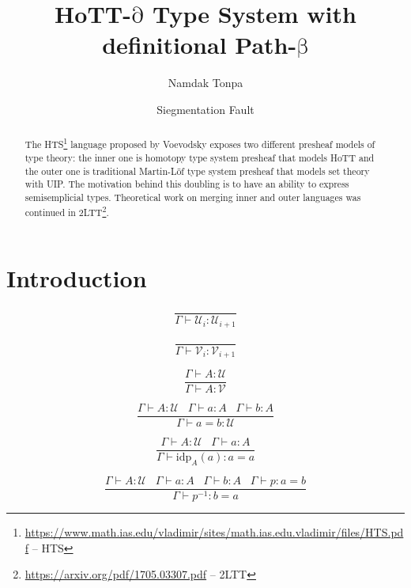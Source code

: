\documentclass[a4paper,UKenglish,cleveref, autoref, thm-restate]{lipics-v2021}
\title{HoTT-\ensuremath{\mathrm{\partial}} Type System with definitional Path-\ensuremath{\mathrm{\beta}}}
\author{Namdak Tonpa}{Groupoid Infinity}{maxim@synrc.com}{https://orcid.org/0000-0001-7127-8796}{}
\author{Siegmentation Fault}{Groupoid Infinity}{siegmentationfault@yandex.ru}{}{}
\newcommand{\UU}{\ensuremath{\mathcal{U}}}
\newcommand{\VV}{\ensuremath{\mathcal{V}}}
\begin{document}
\maketitle

\begin{abstract}
The HTS\footnote{\url{https://www.math.ias.edu/vladimir/sites/math.ias.edu.vladimir/files/HTS.pdf} -- HTS}
language proposed by Voevodsky exposes two different presheaf models of type theory:
the inner one is homotopy type system presheaf that models HoTT and the outer one is traditional Martin-Löf
type system presheaf that models set theory with UIP. The motivation behind this doubling is to
have an ability to express semisemplicial types. Theoretical work on merging inner
and outer languages was continued in 2LTT\footnote{\url{https://arxiv.org/pdf/1705.03307.pdf} -- 2LTT}.
\end{abstract}

\section{Introduction}
\label{sec:typesetting-summary}

\begin{equation*}
    \frac{}{\Gamma \vdash \UU_i : \UU_{i + 1}}
\end{equation*}

\begin{equation*}
    \frac{}{\Gamma \vdash \VV_i : \VV_{i + 1}}
\end{equation*}

\begin{equation*}
    \frac{\Gamma \vdash A : \UU}{\Gamma \vdash A : \VV}
\end{equation*}

\begin{equation*}
    \frac{\Gamma \vdash A : \UU \hspace{10pt} \Gamma \vdash a : A \hspace{10pt} \Gamma \vdash b : A}{\Gamma \vdash a = b : \UU}
\end{equation*}

\begin{equation*}
    \frac{\Gamma \vdash A : \UU \hspace{10pt} \Gamma \vdash a : A}{\Gamma \vdash \mathrm{idp}_A(a) : a = a}
\end{equation*}

\begin{equation*}
    \frac{\Gamma \vdash A : \UU \hspace{10pt} \Gamma \vdash a : A \hspace{10pt} \Gamma \vdash b : A \hspace{10pt} \Gamma \vdash p : a = b}{\Gamma \vdash p^{-1} : b = a}
\end{equation*}
\end{document}
